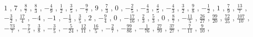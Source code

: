 \documentclass[12pt,fleqn]{article}
\theoremstyle{aufg}
\theoremstyle{bsp}
\begin{document}
\begin{flushleft}
$ \scriptstyle1$ , $ \scriptstyle7$ , $ \scriptstyle\frac{8}{7}$ , $ \scriptstyle\frac{8}{3}$ , $ \scriptstyle- \frac{4}{9}$ , $ \scriptstyle\frac{1}{2}$ , $ \scriptstyle\frac{3}{5}$ , $ \scriptstyle- \frac{9}{7}$ , $ \scriptstyle9$ , $ \scriptstyle\frac{7}{3}$ , $ \scriptstyle0$ , $ \scriptstyle- \frac{2}{5}$ , $ \scriptstyle- \frac{4}{3}$ , $ \scriptstyle\frac{4}{5}$ , $ \scriptstyle- \frac{4}{3}$ , $ \scriptstyle\frac{3}{2}$ , $ \scriptstyle\frac{9}{8}$ , $ \scriptstyle- \frac{1}{2}$ , $ \scriptstyle1$ , $ \scriptstyle\frac{7}{9}$ , $ \scriptstyle\frac{13}{7}$ , $ \scriptstyle- \frac{3}{2}$ , $ \scriptstyle\frac{17}{4}$ , $ \scriptstyle-4$ , $ \scriptstyle-1$ , $ \scriptstyle- \frac{1}{3}$ , $ \scriptstyle\frac{3}{5}$ , $ \scriptstyle2$ , $ \scriptstyle- \frac{9}{4}$ , $ \scriptstyle0$ , $ \scriptstyle- \frac{17}{16}$ , $ \scriptstyle\frac{2}{3}$ , $ \scriptstyle\frac{5}{3}$ , $ \scriptstyle0$ , $ \scriptstyle\frac{8}{7}$ , $ \scriptstyle- \frac{11}{5}$ , $ \scriptstyle\frac{26}{27}$ , $ \scriptstyle\frac{99}{20}$ , $ \scriptstyle\frac{72}{35}$ , $ \scriptstyle\frac{107}{10}$ , $ \scriptstyle- \frac{73}{7}$ , $ \scriptstyle- \frac{7}{5}$ , $ \scriptstyle\frac{3}{8}$ , $ \scriptstyle- \frac{3}{5}$ , $ \scriptstyle- \frac{5}{24}$ , $ \scriptstyle\frac{12}{11}$ , $ \scriptstyle\frac{16}{5}$ , $ \scriptstyle- \frac{2}{7}$ , $ \scriptstyle- \frac{99}{86}$ , $ \scriptstyle- \frac{1}{76}$ , $ \scriptstyle\frac{27}{70}$ , $ \scriptstyle\frac{37}{27}$ , $ \scriptstyle- \frac{7}{11}$ , $ \scriptstyle\frac{9}{10}$ , \end{flushleft} 
\end{document}
